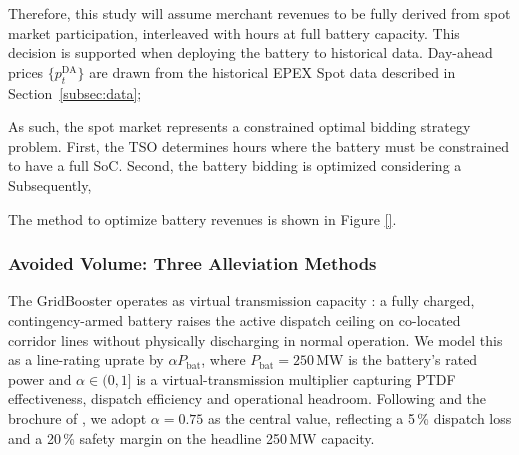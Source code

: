 Therefore, this study will assume merchant revenues to be fully derived from spot market participation, interleaved with hours at full battery capacity. This decision is supported when deploying the battery to historical data. Day-ahead prices $\{p_t^{\mathrm{DA}}\}$ are drawn from the historical EPEX Spot data described in Section~\ref{subsec:data}; %

As such, the spot market represents a constrained optimal bidding strategy problem.
First, the TSO determines hours where the battery must be constrained to have a full SoC. Second, the battery bidding is optimized considering a 
Subsequently, 

The method to optimize battery revenues is shown in Figure \ref{}.





\subsubsection{Avoided Volume: Three Alleviation Methods}\label{Subsubsec3:Alleviation_methods}
 
The GridBooster operates as virtual transmission capacity \citep{Fluence_2020_Virtual_Transmission_Whitepaper, Bauknecht_2024_Role_of_Decentralized_Flexibility_Options}: a fully charged, contingency-armed battery raises the active dispatch ceiling on co-located corridor lines without physically discharging in normal operation. We model this as a line-rating uprate by $\alpha P_{\mathrm{bat}}$, where $P_{\mathrm{bat}} = 250$\,MW is the battery's rated power and $\alpha \in (0, 1]$ is a virtual-transmission multiplier capturing PTDF effectiveness, dispatch efficiency and operational headroom. Following \citet{Consentec_Fluence_2025_GridBooster_Monetary_Valuation} and the brochure of \citet{TransnetBW_2024_Netzbooster_Brochure}, we adopt $\alpha = 0.75$ as the central value, reflecting a 5\,\% dispatch loss and a 20\,\% safety margin on the headline 250\,MW capacity.
 

